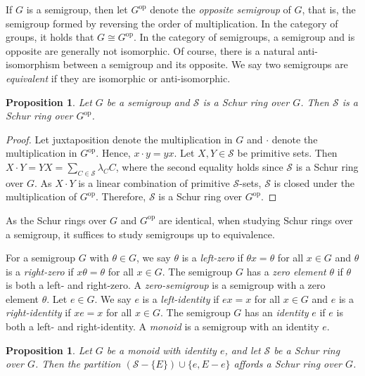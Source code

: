\documentclass{article}
\theoremstyle{plain}
\newtheorem{Prop}[Thm]{Proposition}
\theoremstyle{definition}
\renewcommand{\S}{\mathcal{S}}
\begin{document}
If $G$ is a semigroup, then let \label{Pageop}$G^\text{op}$ denote the \emph{opposite semigroup} of $G$, that is, the semigroup formed by reversing the order of multiplication. In the category of groups, it holds that $G\cong G^{\text{op}}$. In the category of semigroups, a semigroup and is opposite are generally not isomorphic. Of course, there is a natural anti-isomorphism between a semigroup and its opposite. We say two semigroups are \emph{equivalent} if they are isomorphic or anti-isomorphic.

\begin{Prop} Let $G$ be a semigroup and $\S$ is a Schur ring over $G$. Then $\S$ is a Schur ring over $G^\text{op}$.
\end{Prop}
\begin{proof}
    Let juxtaposition denote the multiplication in $G$ and $\cdot$ denote the multiplication in $G^\text{op}$. Hence, $x\cdot y = yx$. Let $X,Y\in \S$ be primitive sets. Then $X\cdot Y = YX = \sum_{C\in \S}\lambda_CC$, where the second equality holds since $\S$ is a Schur ring over $G$. As $X\cdot Y$ is a linear combination of primitive $\S$-sets, $\S$ is closed under the multiplication of $G^\text{op}$. Therefore, $\S$ is a Schur ring over $G^\text{op}$.
\end{proof}

As the Schur rings over $G$ and $G^\text{op}$ are identical, when studying Schur rings over a semigroup, it suffices to study semigroups up to equivalence.

For a semigroup $G$ with $\theta\in G$, we say $\theta$ is a \emph{left-zero} if $\theta x=\theta$ for all $x\in G$ and $\theta$ is a \emph{right-zero} if $x\theta = \theta$ for all $x\in G$. The semigroup $G$ has a \emph{zero element} $\theta$ if $\theta$ is both a left- and right-zero. A \emph{zero-semigroup} is a semigroup with a zero element $\theta$. Let $e\in G$. We say $e$ is a \emph{left-identity} if $ex=x$ for all $x\in G$ and $e$ is a \emph{right-identity} if $xe = x$ for all $x\in G$. The semigroup $G$ has an \emph{identity} $e$ if $e$ is both a left- and right-identity. A \emph{monoid} is a semigroup with an identity $e$. %

\begin{Prop}\label{prop:monoidschur} Let $G$ be a monoid with identity $e$, and let $\S$ be a Schur ring over $G$. Then the partition $(\S - \{E\}) \cup \{e, E - e\}$ affords a Schur ring over $G$.
\end{Prop}
\end{document}
